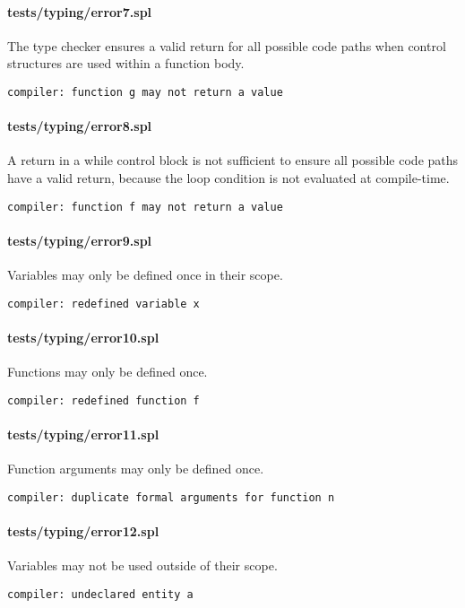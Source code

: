 \documentclass[a4paper]{article}
\begin{document}
\paragraph{tests/typing/error7.spl}
The type checker ensures a valid return for all possible code paths when control structures are used within a function body.
    \begin{verbatim}
compiler: function g may not return a value\end{verbatim}

\paragraph{tests/typing/error8.spl}
A return in a while control block is not sufficient to ensure all possible code paths have a valid return, because the loop condition is not evaluated at compile-time.
    \begin{verbatim}
compiler: function f may not return a value\end{verbatim}

\paragraph{tests/typing/error9.spl}
Variables may only be defined once in their scope.
    \begin{verbatim}
compiler: redefined variable x\end{verbatim}

\paragraph{tests/typing/error10.spl}
Functions may only be defined once.
    \begin{verbatim}
compiler: redefined function f\end{verbatim}

\paragraph{tests/typing/error11.spl}
Function arguments may only be defined once.
    \begin{verbatim}
compiler: duplicate formal arguments for function n\end{verbatim}

\paragraph{tests/typing/error12.spl}
Variables may not be used outside of their scope.
    \begin{verbatim}
compiler: undeclared entity a\end{verbatim}
\end{document}
